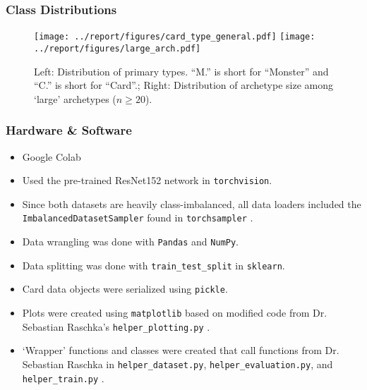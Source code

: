 \documentclass[11pt]{beamer}
\begin{document}
\begin{frame}
	\frametitle{Class Distributions}

	\begin{figure}[t]
	\begin{center}
		  \texttt{[image: ../report/figures/card\_type\_general.pdf]}
		  \hspace{0.1cm}
		  \texttt{[image: ../report/figures/large\_arch.pdf]}
	\end{center}
	\caption[caption]{Left: Distribution of primary types. ``M.'' is short for ``Monster'' and ``C.'' is short for ``Card''.; Right: Distribution of archetype size among `large' archetypes ($n\geq 20$).}
	\label{fig:eda}
	\end{figure}

\end{frame}

\begin{frame}
	\frametitle{Hardware \& Software}
	\pause
	\begin{itemize}
	\item Google Colab
	\pause
	\item Used the pre-trained ResNet152 network in \texttt{torchvision}.
	\pause
	\item Since both datasets are heavily class-imbalanced, all data loaders included the \texttt{ImbalancedDatasetSampler} found in \texttt{torchsampler} \cite{imbal}.
	\pause
	\item Data wrangling was done with \texttt{Pandas} and \texttt{NumPy}.
	\item Data splitting was done with \texttt{train\_test\_split} in \texttt{sklearn}.
	\item Card data objects were serialized using \texttt{pickle}.
	\item Plots were created using \texttt{matplotlib} based on modified code from Dr. Sebastian Raschka's \texttt{helper\_plotting.py} \cite{seb}.
	\item `Wrapper' functions and classes were created that call functions from Dr. Sebastian Raschka in \texttt{helper\_dataset.py}, \texttt{helper\_evaluation.py}, and \texttt{helper\_train.py} \cite{seb}. 
	\end{itemize}

\end{frame}

%
%
\end{document}
